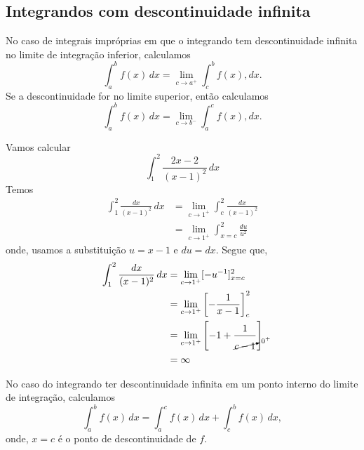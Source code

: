 \subsection{Integrandos com descontinuidade infinita}

No caso de integrais impróprias em que o integrando tem descontinuidade infinita no limite de integração inferior, calculamos
\begin{equation}
  \int_a^bf(x)\,dx = \lim_{c\to a^+}\int_c^bf(x),dx.
\end{equation}
Se a descontinuidade for no limite superior, então calculamos
\begin{equation}
  \int_a^bf(x)\,dx = \lim_{c\to b^-}\int_a^cf(x),dx.
\end{equation}

\begin{ex}
  Vamos calcular
  \begin{equation}
    \int_1^2\frac{2x - 2}{(x-1)^2}\,dx
  \end{equation}
  Temos
  \begin{align}
    \int_1^2\frac{dx}{(x-1)^2}\,dx &= \lim_{c\to 1^+}\int_c^2\frac{dx}{(x-1)^2}\\
                                   &= \lim_{c\to 1^+}\int_{x=c}^2\frac{du}{u^2}
  \end{align}
  onde, usamos a substituição $u = x-1$ e $du = dx$. Segue que,
  \begin{align}
    \int_1^2\frac{dx}{(x-1)^2}\,dx &= \lim_{c\to 1^+}[-u^{-1}]_{x=c}^2\\
                                   &= \lim_{c\to 1^+}\left[-\frac{1}{x-1}\right]_{c}^2\\
                                   &= \lim_{c\to 1^+}\left[-1 + \frac{1}{\cancelto{0^+}{c-1}}\right]\\
                                   &= \infty
  \end{align}
\end{ex}

No caso do integrando ter descontinuidade infinita em um ponto interno do limite de integração, calculamos
\begin{equation}
  \int_a^bf(x)\,dx = \int_{a}^cf(x)\,dx + \int_c^bf(x)\,dx,
\end{equation}
onde, $x=c$ é o ponto de descontinuidade de $f$.


